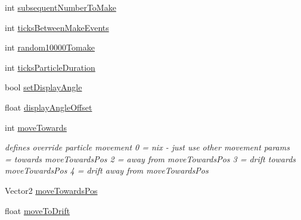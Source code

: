 \begin{DoxyCompactItemize}
\item 
int \mbox{\hyperlink{class_r_c___framework_1_1_particle_system_a1f5308e212ae17bcdd21cc7ac1516f23}{subsequent\+Number\+To\+Make}}
\item 
int \mbox{\hyperlink{class_r_c___framework_1_1_particle_system_a7f84c6b6e2d4f0314e6ab67e8a835b5a}{ticks\+Between\+Make\+Events}}
\item 
int \mbox{\hyperlink{class_r_c___framework_1_1_particle_system_ae1051896325086ff0081894a391735a8}{random10000\+Tomake}}
\item 
int \mbox{\hyperlink{class_r_c___framework_1_1_particle_system_ab467807a417cc9f022d4ef7bb4561035}{ticks\+Particle\+Duration}}
\item 
bool \mbox{\hyperlink{class_r_c___framework_1_1_particle_system_af2fb2ff9ebf53545b72d20c0e52db834}{set\+Display\+Angle}}
\item 
float \mbox{\hyperlink{class_r_c___framework_1_1_particle_system_a9e0e6de2a6683d3a9deb7a762222ab2d}{display\+Angle\+Offset}}
\item 
int \mbox{\hyperlink{class_r_c___framework_1_1_particle_system_a0b390b18ea379c0a285cad7f02d1cafe}{move\+Towards}}
\begin{DoxyCompactList}\small\item\em defines override particle movement 0 = nix -\/ just use other movement params ~ = towards move\+Towards\+Pos 2 = away from move\+Towards\+Pos 3 = drift towards move\+Towards\+Pos 4 = drift away from move\+Towards\+Pos \end{DoxyCompactList}\item 
Vector2 \mbox{\hyperlink{class_r_c___framework_1_1_particle_system_a863bb790d4e1c5ed363ece08509b96b6}{move\+Towards\+Pos}}
\item 
float \mbox{\hyperlink{class_r_c___framework_1_1_particle_system_a7d438b6f40ce329bd24ada1fafdfa020}{move\+To\+Drift}}
\end{DoxyCompactItemize}


